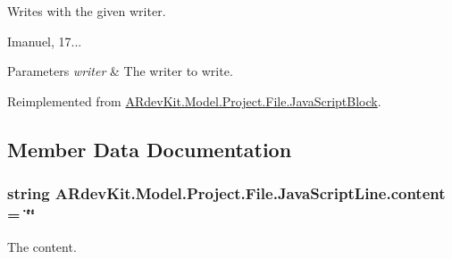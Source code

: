 Writes with the given writer. 

Imanuel, 17... 


\begin{DoxyParams}{Parameters}
{\em writer} & The writer to write. \\
\hline
\end{DoxyParams}


Reimplemented from \hyperlink{class_a_rdev_kit_1_1_model_1_1_project_1_1_file_1_1_java_script_block_afe7251c8168c8d6062c7054bf0c21bf1}{A\-Rdev\-Kit.\-Model.\-Project.\-File.\-Java\-Script\-Block}.



\subsection{Member Data Documentation}
\hypertarget{class_a_rdev_kit_1_1_model_1_1_project_1_1_file_1_1_java_script_line_ac13eaaa9582b295e64a38594f11abb6e}{
\subsubsection[{content}]{\setlength{\rightskip}{0pt plus 5cm}string A\-Rdev\-Kit.\-Model.\-Project.\-File.\-Java\-Script\-Line.\-content = \char`\"{}\char`\"{}\hspace{0.3cm}{\ttfamily [protected]}}}\label{class_a_rdev_kit_1_1_model_1_1_project_1_1_file_1_1_java_script_line_ac13eaaa9582b295e64a38594f11abb6e}


The content. 

